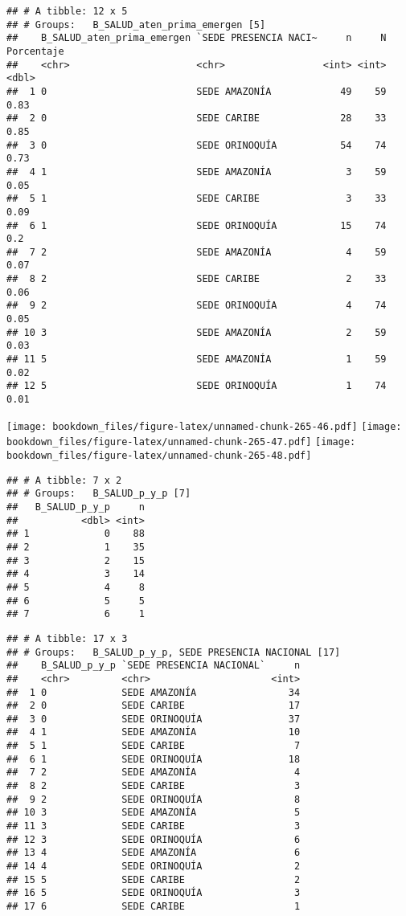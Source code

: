 \documentclass[]{article}
\theoremstyle{definition}
\theoremstyle{definition}
\theoremstyle{definition}
\theoremstyle{remark}
\begin{document}
\begin{verbatim}
## # A tibble: 12 x 5
## # Groups:   B_SALUD_aten_prima_emergen [5]
##    B_SALUD_aten_prima_emergen `SEDE PRESENCIA NACI~     n     N Porcentaje
##    <chr>                      <chr>                 <int> <int>      <dbl>
##  1 0                          SEDE AMAZONÍA            49    59       0.83
##  2 0                          SEDE CARIBE              28    33       0.85
##  3 0                          SEDE ORINOQUÍA           54    74       0.73
##  4 1                          SEDE AMAZONÍA             3    59       0.05
##  5 1                          SEDE CARIBE               3    33       0.09
##  6 1                          SEDE ORINOQUÍA           15    74       0.2 
##  7 2                          SEDE AMAZONÍA             4    59       0.07
##  8 2                          SEDE CARIBE               2    33       0.06
##  9 2                          SEDE ORINOQUÍA            4    74       0.05
## 10 3                          SEDE AMAZONÍA             2    59       0.03
## 11 5                          SEDE AMAZONÍA             1    59       0.02
## 12 5                          SEDE ORINOQUÍA            1    74       0.01
\end{verbatim}

\texttt{[image: bookdown\_files/figure-latex/unnamed-chunk-265-46.pdf]}
\texttt{[image: bookdown\_files/figure-latex/unnamed-chunk-265-47.pdf]}
\texttt{[image: bookdown\_files/figure-latex/unnamed-chunk-265-48.pdf]}

\begin{verbatim}
## # A tibble: 7 x 2
## # Groups:   B_SALUD_p_y_p [7]
##   B_SALUD_p_y_p     n
##           <dbl> <int>
## 1             0    88
## 2             1    35
## 3             2    15
## 4             3    14
## 5             4     8
## 6             5     5
## 7             6     1
\end{verbatim}

\begin{verbatim}
## # A tibble: 17 x 3
## # Groups:   B_SALUD_p_y_p, SEDE PRESENCIA NACIONAL [17]
##    B_SALUD_p_y_p `SEDE PRESENCIA NACIONAL`     n
##    <chr>         <chr>                     <int>
##  1 0             SEDE AMAZONÍA                34
##  2 0             SEDE CARIBE                  17
##  3 0             SEDE ORINOQUÍA               37
##  4 1             SEDE AMAZONÍA                10
##  5 1             SEDE CARIBE                   7
##  6 1             SEDE ORINOQUÍA               18
##  7 2             SEDE AMAZONÍA                 4
##  8 2             SEDE CARIBE                   3
##  9 2             SEDE ORINOQUÍA                8
## 10 3             SEDE AMAZONÍA                 5
## 11 3             SEDE CARIBE                   3
## 12 3             SEDE ORINOQUÍA                6
## 13 4             SEDE AMAZONÍA                 6
## 14 4             SEDE ORINOQUÍA                2
## 15 5             SEDE CARIBE                   2
## 16 5             SEDE ORINOQUÍA                3
## 17 6             SEDE CARIBE                   1
\end{verbatim}
\end{document}

